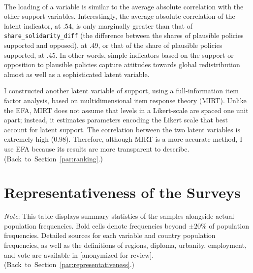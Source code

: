 ~\\
The loading of a variable is similar to the average absolute correlation with the other support variables. Interestingly, the average absolute correlation of the latent indicator, at .54, is only marginally greater than that of \verb|share_solidarity_diff| (the difference between the shares of plausible policies supported and opposed), at .49, or that of the share of plausible policies supported, at .45. In other words, simple indicators based on the support or opposition to plausible policies capture attitudes towards global redistribution almost as well as a sophisticated latent variable. 

I constructed another latent variable of support, using a full-information item factor analysis, based on multidimensional item response theory (MIRT). Unlike the EFA, MIRT does not assume that levels in a Likert-scale are spaced one unit apart; instead, it estimates parameters encoding the Likert scale that best account for latent support. The correlation between the two latent variables is extremely high (0.98). Therefore, although MIRT is a more accurate method, I use EFA because its results are more transparent to describe. \hfill (Back~to~Section~\ref{par:ranking}.) %

\clearpage
\section{Representativeness of the Surveys}\label{app:representativeness}

\begin{table}[h!]
    \caption[Sample representativeness in All, Eu, EU]{Sample representativeness overall, in Europe, and in the European Union. %
    } \label{tab:representativeness_0}
    \makebox[\textwidth][c]{
        \resizebox*{!}{.73\textheight}{%
        
        }
    }
    {\footnotesize \textit{Note}: This table displays summary statistics of the samples alongside actual population frequencies. Bold cells denote frequencies beyond $\pm 20\%$ of population frequencies. 
    Detailed sources for each variable and country population frequencies, as well as the definitions of regions, diploma, urbanity, employment, and vote are available in [anonymized for review]. %
    \hfill (Back~to~Section~\ref{par:representativeness}.) %
    } 
\end{table}


